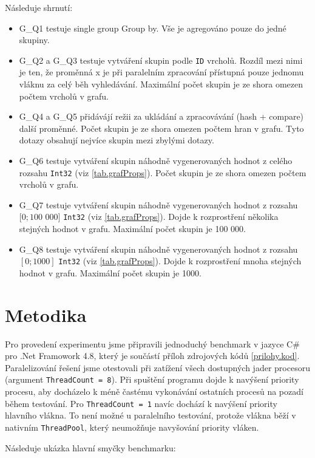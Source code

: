 Následuje shrnutí:
\begin{itemize}

\item G\_Q1 testuje single group Group by. Vše je agregováno pouze do jedné skupiny. 
\item G\_Q2 a G\_Q3  testuje vytváření skupin podle \verb+ID+ vrcholů. Rozdíl mezi nimi je ten, že proměnná x je při paralelním zpracování přístupná pouze jednomu vláknu za celý běh vyhledávání. Maximální počet skupin je ze shora omezen počtem vrcholů v grafu.
\item G\_Q4 a G\_Q5 přidávájí režii za ukládání a zpracovávání (hash + compare) další proměnné. Počet skupin je ze shora omezen počtem hran v grafu. Tyto dotazy obsahují nejvíce skupin mezi zbylými dotazy.
\item G\_Q6 testuje vytváření skupin náhodně vygenerovaných hodnot z celého rozsahu \verb+Int32+ (viz \ref{tab.grafProps}). Počet skupin je ze shora omezen počtem vrcholů v grafu.
\item G\_Q7 testuje vytváření skupin náhodně vygenerovaných hodnot z rozsahu $[0; 100$ $000]$ \verb+Int32+ (viz \ref{tab.grafProps}). Dojde k rozprostření několika stejných hodnot v grafu. Maximální počet skupin je 100 000.
\item G\_Q8  testuje vytváření skupin náhodně vygenerovaných hodnot z rozsahu $[0; 1000]$ \verb+Int32+ (viz \ref{tab.grafProps}). Dojde k rozprostření mnoha stejných hodnot v grafu. Maximální počet skupin je 1000.

\end{itemize}

\section{Metodika}
Pro provedení experimentu jsme připravili jednoduchý benchmark v jazyce C\# pro .Net Framowork 4.8, který je součástí příloh zdrojových kódů \ref{prilohy.kod}.
Paralelizování řešení jsme otestovali při zatížení všech dostupných jader procesoru (argument \verb+ThreadCount = 8+).
Při spuštění programu dojde k navýšení priority procesu, aby docházelo k méně častému vykonávání ostatních procesů na pozadí během testování. 
Pro \verb+ThreadCount = 1+ navíc dochází k navýšení priority hlavního vlákna. 
To není možné u paralelního testování, protože vlákna běží v nativním \verb+ThreadPool+, který neumožňuje navyšování priority vláken.

Následuje ukázka hlavní smyčky benchmarku:

